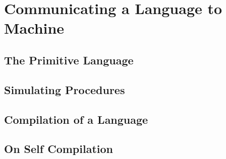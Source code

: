 
\chapter{Communicating a Language to Machine}

\section{The Primitive Language}

\section{Simulating Procedures}

\section{Compilation of a Language}

\section{On Self Compilation}

